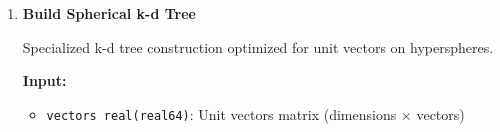 \documentclass[11pt]{article}
\begin{document}
\begin{enumerate}
\begin{enumerate}
\begin{itemize}
	      	      	\item \texttt{num\_points integer(int32)}: Number of points
	      	      	      
	      	      	\item \texttt{dimension\_order integer(int32)}: Dimension ordering for
	      	      	      splitting (1-based)
	      	      \end{itemize}
	      	      \textbf{Output:}
	      	      \begin{itemize}
	      	      	\item \texttt{kd\_indices integer(int32)}: Output index array (1-based)
	      	      	      
	      	      	\item \texttt{workspace integer(int32)}: Workspace array
	      	      	      
	      	      	\item \texttt{value\_buffer real(real64)}: Value buffer for sorting
	      	      	      
	      	      	\item \texttt{permutation integer(int32)}: Permutation array
	      	      	      
	      	      	\item \texttt{left\_stack, right\_stack integer(int32)}: Sorting stacks
	      	      	      
	      	      	\item \texttt{recursion\_stack integer(int32)}: Recursion stack
	      	      	      
	      	      	\item \texttt{ierr integer(int32)}: Error code
	      	      \end{itemize}
	      	      \begin{lstlisting}[language=Fortran]
call build_kd_index(points, num_dimensions, num_points, kd_indices, &
                    dimension_order, workspace, value_buffer, &
                    permutation, left_stack, right_stack, &
                    recursion_stack, ierr)
	      	      \end{lstlisting}
	      	      
	      	\item \textbf{Build Spherical k-d Tree}
	      	      
	      	      Specialized k-d tree construction optimized for unit vectors on hyperspheres.
	      	      
	      	      \textbf{Input:}
	      	      \begin{itemize}
	      	      	\item \texttt{vectors real(real64)}: Unit vectors matrix (dimensions
	      	      	      × vectors)
	      	      	      

\end{itemize}
\end{enumerate}
\end{enumerate}
\end{document}
